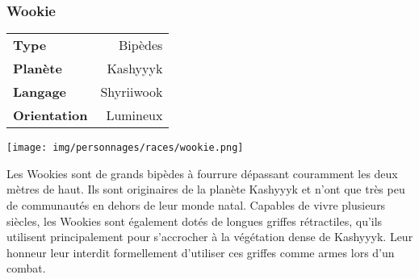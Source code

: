 \subsubsection{Wookie}
\begin{samepage}
	\begin{flushright}
		\begin{tabular}{|l|r|}
			\textbf{Type} 			& Bipèdes \\
		   	\textbf{Planète} 		& Kashyyyk \\
		   	\textbf{Langage} 		& Shyriiwook \\
		   	\textbf{Orientation} 	& Lumineux \\
		\end{tabular}
	\end{flushright}
	\vspace{-6\baselineskip}
	\texttt{[image: img/personnages/races/wookie.png]}
\end{samepage}

Les Wookies sont de grands bipèdes à fourrure dépassant couramment les deux mètres de haut. Ils sont originaires de la planète Kashyyyk et n’ont que très peu de communautés en dehors de leur monde natal. Capables de vivre plusieurs siècles, les Wookies sont également dotés de longues griffes rétractiles, qu’ils utilisent principalement pour s’accrocher à la végétation dense de Kashyyyk. Leur honneur leur interdit formellement d’utiliser ces griffes comme armes lors d’un combat.

